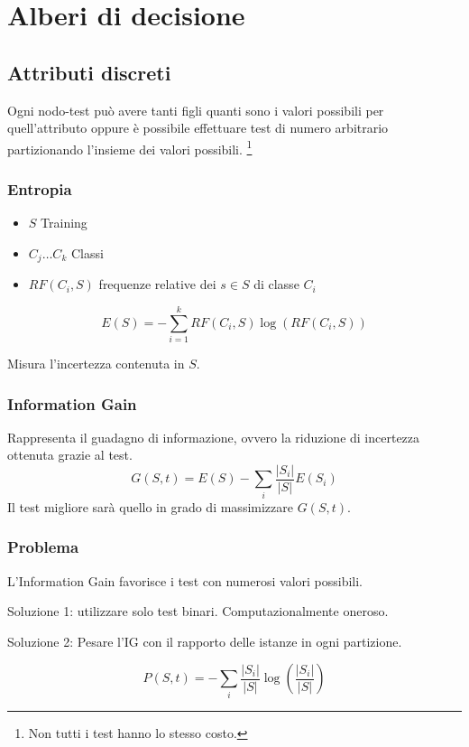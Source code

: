 \documentclass[11pt,onecolumn,a4paper,oneside]{book}
\begin{document}
	
\chapter{Alberi di decisione}

\section{Attributi discreti}
Ogni nodo-test può avere tanti figli quanti sono i valori possibili per quell'attributo oppure è possibile effettuare test di numero arbitrario partizionando l'insieme dei valori possibili.
\footnote{Non tutti i test hanno lo stesso costo.}

\subsection{Entropia}

\begin{itemize}
\item $S$ Training
\item $C_j \dots C_k$ Classi
\item $RF(C_i,S)$ frequenze relative dei $s \in S$ di classe $C_i$
\end{itemize}
$$E(S) = - \sum_{i=1}^k RF(C_i, S) \log (RF(C_i,S))$$

Misura l'incertezza contenuta in $S$.

\subsection{Information Gain}
Rappresenta il guadagno di informazione, ovvero la riduzione di incertezza ottenuta grazie al test.
$$ G(S,t) = E(S) - \sum_{i} \frac{ \left| S_i \right| }{ \left| S \right| } E(S_i)$$
Il test migliore sarà quello in grado di massimizzare $G(S,t)$.

\subsection{Problema}
	L'Information Gain favorisce i test con numerosi valori possibili.

	Soluzione 1: utilizzare solo test binari. Computazionalmente oneroso.
	
	Soluzione 2: Pesare l'IG con il rapporto delle istanze in ogni partizione.
	
	$$ P(S,t) = - \sum_i \frac{ \left| S_i \right| }{ \left| S \right| } \log \left( \frac{ \left| S_i \right| }{ \left| S \right| } \right) $$
	
\end{document}
